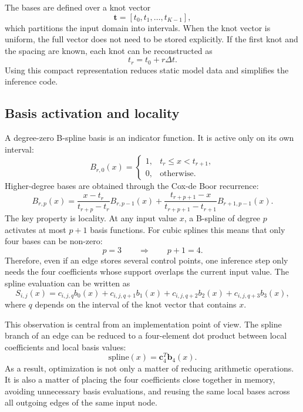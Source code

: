 \documentclass[11pt,a4paper]{article}
\begin{document}
The bases are defined over a knot vector
\begin{equation}
    \bm{t} = [t_0,t_1,\ldots,t_{K-1}],
\end{equation}
which partitions the input domain into intervals.
When the knot vector is uniform, the full vector does not need to be stored explicitly.
If the first knot and the spacing are known, each knot can be reconstructed as
\begin{equation}
    t_r = t_0 + r\Delta t.
\end{equation}
Using this compact representation reduces static model data and simplifies the inference code.

\subsection{Basis activation and locality}

A degree-zero B-spline basis is an indicator function.
It is active only on its own interval:
\begin{equation}
B_{r,0}(x) =
\begin{cases}
1, & t_r \le x < t_{r+1},\\
0, & \text{otherwise}.
\end{cases}
\end{equation}
Higher-degree bases are obtained through the Cox-de Boor recurrence:
\begin{equation}
B_{r,p}(x)
=
\frac{x-t_r}{t_{r+p}-t_r} B_{r,p-1}(x)
+
\frac{t_{r+p+1}-x}{t_{r+p+1}-t_{r+1}} B_{r+1,p-1}(x).
\label{eq:cox_de_boor}
\end{equation}
The key property is locality.
At any input value $x$, a B-spline of degree $p$ activates at most $p+1$ basis functions.
For cubic splines this means that only four bases can be non-zero:
\begin{equation}
    p = 3
    \qquad \Rightarrow \qquad
    p+1 = 4.
\end{equation}
Therefore, even if an edge stores several control points, one inference step only needs the four coefficients whose support overlaps the current input value.
The spline evaluation can be written as
\begin{equation}
    S_{i,j}(x)
    =
    c_{i,j,q} b_0(x)
    +
    c_{i,j,q+1} b_1(x)
    +
    c_{i,j,q+2} b_2(x)
    +
    c_{i,j,q+3} b_3(x),
    \label{eq:local_spline}
\end{equation}
where $q$ depends on the interval of the knot vector that contains $x$.

This observation is central from an implementation point of view.
The spline branch of an edge can be reduced to a four-element dot product between local coefficients and local basis values:
\begin{equation}
    \text{spline}(x) = \bm{c}_{4}^{T}\bm{b}_{4}(x).
\end{equation}
As a result, optimization is not only a matter of reducing arithmetic operations.
It is also a matter of placing the four coefficients close together in memory, avoiding unnecessary basis evaluations, and reusing the same local bases across all outgoing edges of the same input node.
\end{document}
